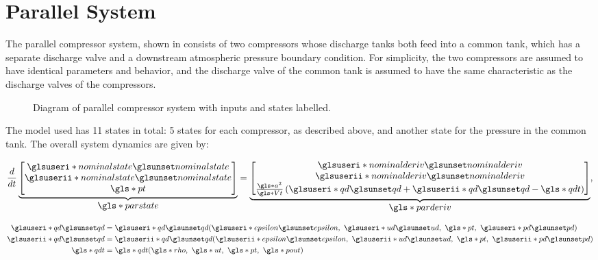 \section{Parallel System}
\label{sec:mod:parallel}

The parallel compressor system, shown in  consists of two compressors whose discharge tanks both feed into a common tank, which has a separate discharge valve and a downstream atmospheric pressure boundary condition.
For simplicity, the two compressors are assumed to have identical parameters and behavior, and the discharge valve of the common tank is assumed to have the same characteristic as the discharge valves of the compressors.

\begin{figure}
  \centering
  
  \caption[Diagram of parallel compressor system.]{Diagram of parallel compressor system with inputs and states labelled.}
  \label{fig:mod:parallel}
\end{figure}



The model used has 11 states in total: 5 states for each compressor, as described above, and another state for the pressure in the common tank. The overall system dynamics are given by:

\begin{equation}
  \dt{}
  \ubrace{\begin{bmatrix}
    \gi{nominalstate}\\
    \gii{nominalstate}\\
    \g{pt} 
  \end{bmatrix}}{\g{parstate}}
  =
  \ubrace{\begin{bmatrix}
    \gi{nominalderiv}\\
    \gii{nominalderiv}\\
    \frac{\g{a}^2}{\g{Vt}}\left(\gi{qd}+\gii{qd}-\g{qdt}\right)
  \end{bmatrix}}{\g{parderiv}},
\end{equation}

\begin{equation}
  \begin{split}
    \gi{qd} & = \gi{qd}(\gi{epsilon},\ \gi{ud},\ \g{pt},\ \gi{pd})\\
    \gii{qd} & = \gii{qd}(\gii{epsilon},\ \gii{ud},\ \g{pt},\ \gii{pd})\\
    \g{qdt} & = \g{qdt}(\g{rho},\ \g{ut},\ \g{pt},\ \g{pout})
  \end{split}
\end{equation}


